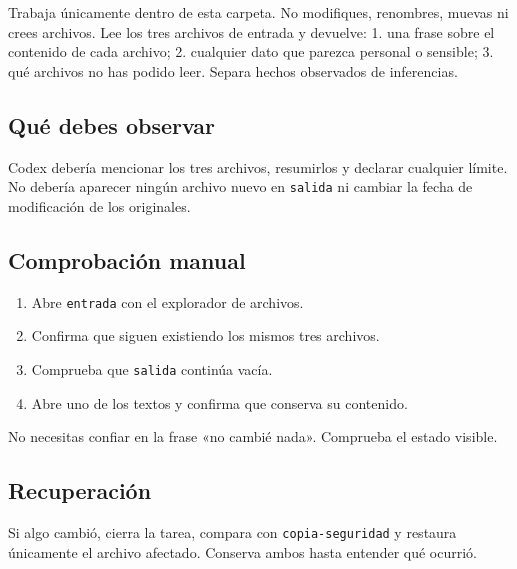 \documentclass[10pt,a4paper,openany]{book}
\providecommand{\tightlist}{\setlength{\itemsep}{0.18em}\setlength{\parskip}{0pt}}
\newenvironment{Shaded}{}{}
\newcommand{\NormalTok}[1]{#1}
\renewenvironment{Shaded}
  {\begin{tcolorbox}[
    enhanced,
    breakable,
    colback=CodeBg,
    colframe=Border,
    boxrule=0.5pt,
    arc=2mm,
    left=3mm,
    right=3mm,
    top=2.2mm,
    bottom=2.2mm,
    before skip=0.8em,
    after skip=0.9em
  ]}
  {\end{tcolorbox}}
\begin{document}
\begin{Shaded}
\begin{Highlighting}[]
\NormalTok{Trabaja únicamente dentro de esta carpeta. No modifiques, renombres, muevas ni}
\NormalTok{crees archivos. Lee los tres archivos de entrada y devuelve:}
\NormalTok{1. una frase sobre el contenido de cada archivo;}
\NormalTok{2. cualquier dato que parezca personal o sensible;}
\NormalTok{3. qué archivos no has podido leer.}
\NormalTok{Separa hechos observados de inferencias.}
\end{Highlighting}
\end{Shaded}

\subsection{Qué debes observar}\label{quuxe9-debes-observar}

Codex debería mencionar los tres archivos, resumirlos y declarar
cualquier límite. No debería aparecer ningún archivo nuevo en
\texttt{salida} ni cambiar la fecha de modificación de los originales.

\subsection{Comprobación manual}\label{comprobaciuxf3n-manual}

\begin{enumerate}
\def\labelenumi{\arabic{enumi}.}
\tightlist
\item
  Abre \texttt{entrada} con el explorador de archivos.
\item
  Confirma que siguen existiendo los mismos tres archivos.
\item
  Comprueba que \texttt{salida} continúa vacía.
\item
  Abre uno de los textos y confirma que conserva su contenido.
\end{enumerate}

No necesitas confiar en la frase «no cambié nada». Comprueba el estado
visible.

\subsection{Recuperación}\label{recuperaciuxf3n-1}

Si algo cambió, cierra la tarea, compara con \texttt{copia-seguridad} y
restaura únicamente el archivo afectado. Conserva ambos hasta entender
qué ocurrió.
\end{document}

